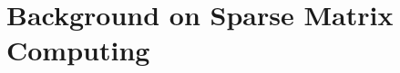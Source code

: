 
\chapter[Background]{Background on Sparse Matrix Computing}
\label{cha:background}

\setcounter{mtc}{12} %
\minitoc








\clearpage